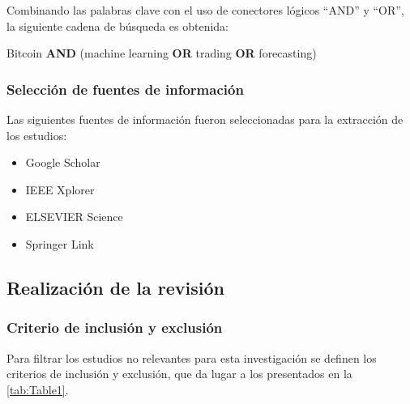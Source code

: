 Combinando las palabras clave con el uso de conectores lógicos “AND” y “OR”, la siguiente cadena de búsqueda es obtenida:\\

\centerline{Bitcoin \textbf{AND} (machine learning \textbf{OR} trading \textbf{OR} forecasting)}

\subsubsection{Selección de fuentes de información}
Las siguientes fuentes de información fueron seleccionadas para la extracción de los estudios:
\begin{itemize}
	\item Google Scholar
	\item IEEE Xplorer
	\item ELSEVIER Science
	\item Springer Link
\end{itemize}

\subsection{Realización de la revisión}
\subsubsection{Criterio de inclusión y exclusión}
Para filtrar los estudios no relevantes para esta investigación se definen los criterios de inclusión y exclusión, que da lugar a los presentados en la \autoref{tab:Table1}.

